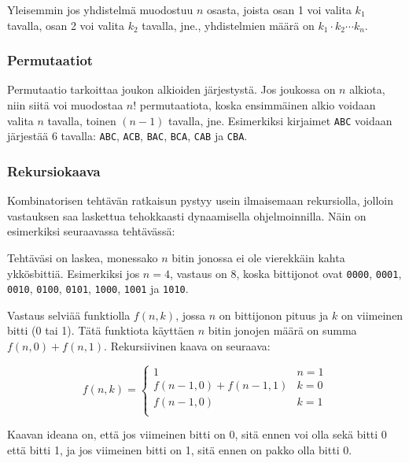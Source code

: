 Yleisemmin jos yhdistelmä muodostuu $n$ osasta,
joista osan 1 voi valita $k_1$ tavalla,
osan 2 voi valita $k_2$ tavalla, jne.,
yhdistelmien määrä on $k_1 \cdot k_2 \cdots k_n$.

\subsubsection*{Permutaatiot}

Permutaatio tarkoittaa joukon alkioiden järjestystä.
Jos joukossa on $n$ alkiota,
niin siitä voi muodostaa $n!$ permutaatiota,
koska ensimmäinen alkio voidaan valita $n$ tavalla,
toinen $(n-1)$ tavalla, jne.
Esimerkiksi kirjaimet \texttt{ABC} voidaan järjestää
6 tavalla:
\texttt{ABC}, \texttt{ACB}, \texttt{BAC}, \texttt{BCA},
\texttt{CAB} ja \texttt{CBA}.

\subsubsection*{Rekursiokaava}

Kombinatorisen tehtävän ratkaisun pystyy usein ilmaisemaan
rekursiolla, jolloin vastauksen saa laskettua tehokkaasti
dynaamisella ohjelmoinnilla.
Näin on esimerkiksi seuraavassa tehtävässä:

\begin{task}
Tehtäväsi on laskea, monessako $n$ bitin jonossa
ei ole vierekkäin kahta ykkösbittiä.
Esimerkiksi jos $n=4$, vastaus on 8,
koska bittijonot ovat \texttt{0000}, \texttt{0001},
\texttt{0010}, \texttt{0100}, \texttt{0101},
\texttt{1000}, \texttt{1001} ja \texttt{1010}.
\end{task}

Vastaus selviää funktiolla $f(n,k)$,
jossa $n$ on bittijonon pituus ja $k$ on viimeinen bitti (0 tai 1).
Tätä funktiota käyttäen $n$ bitin jonojen määrä
on summa $f(n,0)+f(n,1)$.
Rekursiivinen kaava on seuraava:

\begin{equation*}
    f(n,k) = \begin{cases}
               1               & n = 1\\
               f(n-1,0)+f(n-1,1) & k = 0\\
               f(n-1,0) & k = 1\\
           \end{cases}
\end{equation*}

Kaavan ideana on, että jos viimeinen bitti on 0,
sitä ennen voi olla sekä bitti 0 että bitti 1,
ja jos viimeinen bitti on 1, sitä ennen on
pakko olla bitti 0.


